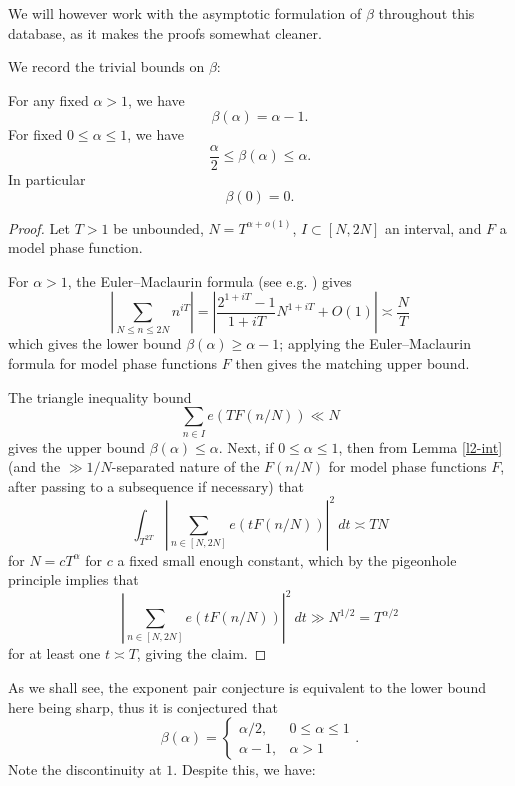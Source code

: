 We will however work with the asymptotic formulation of $\beta$ throughout this database, as it makes the proofs somewhat cleaner.

We record the trivial bounds on $\beta$:

\begin{lemma}\label{beta-triv}  For any fixed $\alpha > 1$, we have
    $$ \beta(\alpha) = \alpha-1.$$
    For fixed $0 \leq \alpha \leq 1$, we have
    $$ \frac{\alpha}{2} \leq \beta(\alpha) \leq \alpha.$$
    In particular
    \begin{equation}\label{beta-0}
        \beta(0)=0.
    \end{equation}
    \end{lemma}


    \begin{proof}  Let $T > 1$ be unbounded, $N = T^{\alpha+o(1)}$, $I \subset [N,2N]$ an interval, and $F$ a model phase function.

        For $\alpha > 1$, the Euler--Maclaurin formula (see e.g. \cite[(2.1.2)]{titchmarsh_theory_1986}) gives
        \begin{equation}\label{nit}
            \left|\sum_{N \leq n \leq 2N} n^{iT}\right| = \left|\frac{2^{1+iT} - 1}{1+iT} N^{1+iT} + O(1)\right| \asymp \frac{N}{T}
        \end{equation}
        which gives the lower bound $\beta(\alpha) \geq \alpha-1$; applying the Euler--Maclaurin formula for model phase functions $F$ then gives the matching upper bound.

        The triangle inequality bound
        $$ \sum_{n \in I} e(T F(n/N)) \ll N$$
        gives the upper bound $\beta(\alpha) \leq \alpha$.  Next, if $0 \leq \alpha \leq 1$, then from Lemma \ref{l2-int} (and the $\gg 1/N$-separated nature of the $F(n/N)$ for model phase functions $F$, after passing to a subsequence if necessary) that
        $$ \int_{T^{2T}} \left|\sum_{n \in [N,2N]} e(t F(n/N)) \right|^2\ dt \asymp T N$$
    for $N = cT^\alpha$ for $c$ a fixed small enough constant, which by the pigeonhole principle implies that
    $$\left| \sum_{n \in [N,2N]}e(t F(n/N)) \right|^2\ dt \gg N^{1/2} = T^{\alpha/2}$$
    for at least one $t \asymp T$, giving the claim.
\end{proof}

As we shall see, the exponent pair conjecture is equivalent to the lower bound here being sharp, thus it is conjectured that
\[
\beta(\alpha) = \begin{cases}
\alpha/2,& 0 \leq \alpha \leq 1\\
\alpha - 1,&\alpha > 1
\end{cases}.
\]
Note the discontinuity at $1$.  Despite this, we have:

